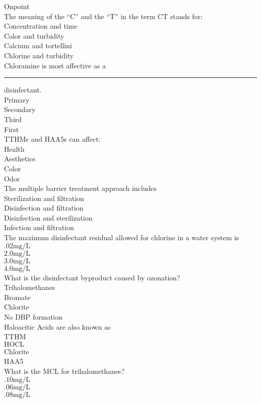 Onpoint\\
The meaning of the “C” and the “T” in the term CT stands for:\\
Concentration and time\\
Color and turbidity\\
Calcium and tortellini\\
Chlorine and turbidity\\
Chloramine is most affective as a \rule{1cm}{0.5pt} disinfectant.\\
Primary\\
Secondary\\
Third\\
First\\
TTHMs and HAA5s can affect:\\
Health\\
Aesthetics\\
Color\\
Odor\\
 The multiple barrier treatment approach includes\\
Sterilization and filtration\\
Disinfection and filtration\\
Disinfection and sterilization\\
Infection and filtration\\
The maximum disinfectant residual allowed for chlorine in a water system is\\
$.02 \mathrm{mg} / \mathrm{L}$\\
$2.0 \mathrm{mg} / \mathrm{L}$\\
$3.0 \mathrm{mg} / \mathrm{L}$\\
$4.0 \mathrm{mg} / \mathrm{L}$\\
 What is the disinfectant byproduct caused by ozonation?\\
Trihalomethanes\\
Bromate\\
Chlorite\\
No DBP formation\\
 Haloacitic Acids are also known as\\
TTHM\\
$\mathrm{HOCL}$\\
Chlorite\\
HAA5\\
 What is the MCL for trihalomethanes?\\
$.10 \mathrm{mg} / \mathrm{L}$\\
$.06 \mathrm{mg} / \mathrm{L}$\\
$.08 \mathrm{mg} / \mathrm{L}$\\
